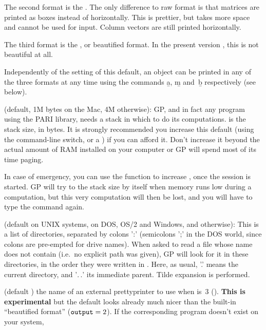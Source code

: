 The second format is the . The only difference to
raw format is that matrices are printed as boxes instead of horizontally.
This is prettier, but takes more space and cannot be used for input. Column
vectors are still printed horizontally.

The third format is the , or beautified format. In
the present version \vers, this is not beautiful at all.


Independently of the setting of this default, an object can be printed
in any of the three formats at any time using the commands \b{a}, \b{m}
and~\b{b} respectively (see below).

 (default, 1M bytes on the Mac, 4M otherwise): GP, and
in fact any program using the PARI library, needs a stack in which to do
its computations.  is the stack size, in bytes. It is
strongly recommended you increase this default (using the 
command-line switch, or a ) if you can afford it. Don't increase
it beyond the actual amount of RAM installed on your computer or GP will
spend most of its time paging.

In case of emergency, you can use the  function to
increase , once the session is started. GP will try to
 the stack size by itself when memory runs low during a
computation, but this very computation will then be lost, and you will have
to type the command again.

 (default  on UNIX systems,
 on DOS, OS/2 and Windows, and  otherwise):
This is a list of directories, separated by colons ':' (semicolons ';' in the
DOS world, since colons are pre-empted for drive names). When asked to read a
file whose name does not contain \kbd{/} (i.e.~no explicit path was given),
GP will look for it in these directories, in the order they were written in
. Here, as usual, '.' means the current directory, and '$.\,.$' its
immediate parent. Tilde expansion is performed.

 (default ) the name of an external prettyprinter to use when
 is~3 (). {\bf This is
experimental} but the default  looks already much nicer than
the built-in ``beautified format'' (${\tt output} = 2$). If the
corresponding program doesn't exist on your system,

